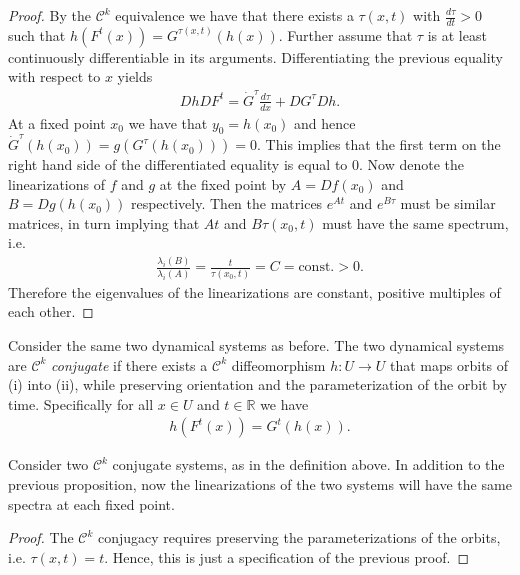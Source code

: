 \begin{proof}
	By the $\mathcal{C}^k$ equivalence we have that there exists a $\tau (x,t)$ with $\frac{d \tau}{d t}>0$ such that $h(F^{t}(x)) = G^{\tau(x,t)}(h(x))$. Further assume that $\tau$ is at least continuously differentiable in its arguments. Differentiating the previous equality with respect to  $x$ yields
	\begin{align}
		Dh DF^{t} = \dot{G}^{\tau }\frac{d \tau }{dx} + D G^{\tau} Dh.
	\end{align}
	At a fixed point $x_0$ we have that $y_0=h(x_0)$ and hence $\dot{G}^{\tau}(h(x_0))=g(G^{\tau}(h(x_0)))=0$. This implies that the first term on the right hand side of the differentiated equality is equal to 0. Now denote the linearizations of $f$ and $g$ at the fixed point by $A=Df(x_0)$ and $B=Dg(h(x_0))$ respectively. Then the matrices $e^{A t} $ and $e^{B\tau} $ must be similar matrices, in turn implying that $ At$ and $B\tau(x_0,t)$ must have the same spectrum, i.e.
	\begin{align}
		\frac{\lambda_i(B)}{\lambda_i(A)} = \frac{t}{\tau(x_0,t)} = C =  \textrm{const.}  >0. 
	\end{align}
Therefore the eigenvalues of the linearizations are constant, positive multiples	of each other.
\end{proof}


\begin{definition}
	Consider the same two dynamical systems as before. The two dynamical systems are $\mathcal{C}^k$ \emph{conjugate} if there exists a $\mathcal{C}^k$ diffeomorphism $h:U \to U$ that maps orbits of (i) into (ii), while preserving orientation and the parameterization of the orbit by time. Specifically for all $x \in U$ and $t \in \mathbb{R}$ we have
	\begin{align}
		\boxed{
			h(F^{t}(x)) = G^{t}(h(x)).
		}
	\end{align}
\end{definition}

\begin{proposition}
	Consider two $\mathcal{C}^{k}$ conjugate systems, as in the definition above. In addition to the previous proposition, now the linearizations of the two systems will have the same spectra at each fixed point.
\end{proposition}
\begin{proof}
	The $\mathcal{C}^{k}$ conjugacy requires preserving the parameterizations of the orbits, i.e. $\tau(x,t) = t$. Hence, this is just a specification of the previous proof.
\end{proof}


